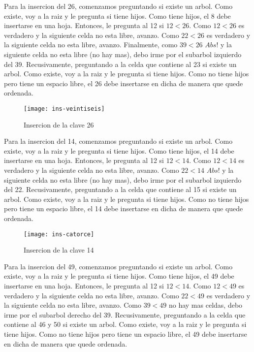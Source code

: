 \documentclass[10pt,a4paper]{article}
\begin{document}
Para la insercion del 26, comenzamos preguntando si existe un arbol. Como existe, voy a la raiz y le pregunta si tiene hijos. Como tiene hijos, el 8 debe insertarse en una hoja. Entonces, le pregunta al 12 si $12 < 26$.
\newline
\newline
Como $12 < 26$ es verdadero y la siguiente celda no esta libre, avanzo. Como $22 < 26$ es verdadero y la siguiente celda no esta libre, avanzo. Finalmente, como $39 < 26$ $Abs!$ y la siguiente celda no esta libre (no hay mas), debo irme por el subarbol izquierdo del 39. Recusivamente, preguntando a la celda que contiene al 23 si existe un arbol. Como existe, voy a la raiz y le pregunta si tiene hijos. Como no tiene hijos pero tiene un espacio libre, el 26 debe insertarse en dicha de manera que quede ordenada.

\begin{figure}[h]
\centering
\texttt{[image: ins-veintiseis]}
\caption{Insercion de la clave 26}
\label{drivers1}
\end{figure}

\newpage

Para la insercion del 14, comenzamos preguntando si existe un arbol. Como existe, voy a la raiz y le pregunta si tiene hijos. Como tiene hijos, el 14 debe insertarse en una hoja. Entonces, le pregunta al 12 si $12 < 14$.
\newline
\newline
Como $12 < 14$ es verdadero y la siguiente celda no esta libre, avanzo. Como $22 < 14$ $Abs!$ y la siguiente celda no esta libre (no hay mas), debo irme por el subarbol izquierdo del 22. Recusivamente, preguntando a la celda que contiene al 15 si existe un arbol. Como existe, voy a la raiz y le pregunta si tiene hijos. Como no tiene hijos pero tiene un espacio libre, el 14 debe insertarse en dicha de manera que quede ordenada.

\begin{figure}[h]
\centering
\texttt{[image: ins-catorce]}
\caption{Insercion de la clave 14}
\label{drivers1}
\end{figure}

Para la insercion del 49, comenzamos preguntando si existe un arbol. Como existe, voy a la raiz y le pregunta si tiene hijos. Como tiene hijos, el 49 debe insertarse en una hoja. Entonces, le pregunta al 12 si $12 < 14$.
\newline
\newline
Como $12 < 49$ es verdadero y la siguiente celda no esta libre, avanzo. Como $22 < 49$ es verdadero y la siguiente celda no esta libre, avanzo. Como $39 < 49$ no hay mas celdas, debo irme por el subarbol derecho del 39. Recusivamente, preguntando a la celda que contiene al 46 y 50 si existe un arbol. Como existe, voy a la raiz y le pregunta si tiene hijos. Como no tiene hijos pero tiene un espacio libre, el 49 debe insertarse en dicha de manera que quede ordenada.
\end{document}
